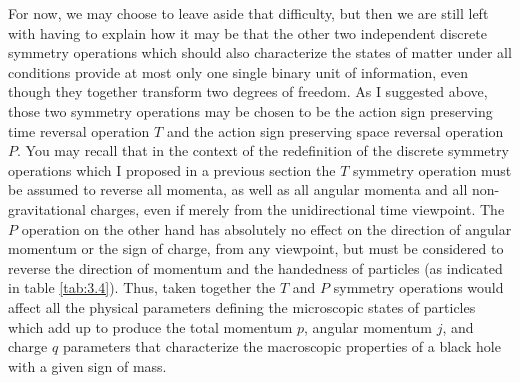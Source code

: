 \documentclass[notitlepage,12pt]{report}
\begin{document}
For now, we may choose to leave aside that difficulty, but then we are still left with having to explain how it may be that the other two independent discrete symmetry operations which should also characterize the states of matter under all conditions provide at most only one single binary unit of information, even though they together transform two degrees of freedom. As I suggested above, those two symmetry operations may be chosen to be the action sign preserving time reversal operation $T$ and the action sign preserving space reversal operation $P$. You may recall that in the context of the redefinition of the discrete symmetry operations which I proposed in a previous section the $T$ symmetry operation must be assumed to reverse all momenta, as well as all angular momenta and all non-gravitational charges, even if merely from the unidirectional time viewpoint. The $P$ operation on the other hand has absolutely no effect on the direction of angular momentum or the sign of charge, from any viewpoint, but must be considered to reverse the direction of momentum and the handedness of particles (as indicated in table \ref{tab:3.4}). Thus, taken together the $T$ and $P$ symmetry operations would affect all the physical parameters defining the microscopic states of particles which add up to produce the total momentum $p$, angular momentum $j$, and charge $q$ parameters that characterize the macroscopic properties of a black hole with a given sign of mass.
\end{document}
